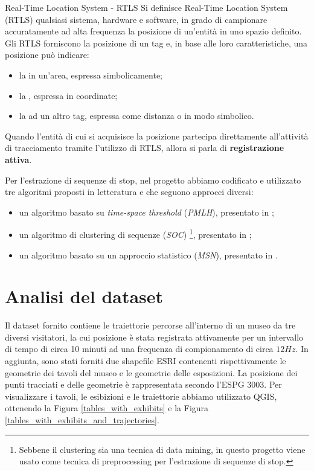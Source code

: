 \documentclass[12pt]{article}
\begin{document}
\begin{definition}{Real-Time Location System - RTLS}{}
    Si definisce Real-Time Location System (RTLS) qualsiasi sistema, hardware e software, in grado di campionare accuratamente ad alta frequenza la posizione di un'entità in uno spazio definito.\\
    Gli RTLS forniscono la posizione di un tag e, in base alle loro caratteristiche, una posizione può indicare:
    \begin{itemize}
        \item la  in un'area, espressa simbolicamente;
        \item la , espressa in coordinate;
        \item la  ad un altro tag, espressa come distanza o in modo simbolico.
    \end{itemize}
    Quando l'entità di cui si acquisisce la posizione partecipa direttamente all'attività di tracciamento tramite l'utilizzo di RTLS, allora si parla di \textbf{registrazione attiva}.
\end{definition}
Per l'estrazione di sequenze di stop, nel progetto abbiamo codificato e utilizzato tre algoritmi proposti in letteratura e che seguono approcci diversi:
\begin{itemize}
    \item un algoritmo basato su \emph{time-space threshold} (\emph{PMLH}), presentato in \cite{SpaceTimeTreshold};
    \item un algoritmo di clustering di sequenze (\emph{SOC}) \footnote{Sebbene il clustering sia una tecnica di data mining, in questo progetto viene usato come tecnica di preprocessing per l'estrazione di sequenze di stop.}, presentato in \cite{SequenceClustering};
    \item un algoritmo basato su un approccio statistico (\emph{MSN}), presentato in \cite{Statistical}.
\end{itemize}

\section{Analisi del dataset}
Il dataset fornito contiene le traiettorie percorse all'interno di un museo da tre diversi visitatori, la cui posizione è stata registrata attivamente per un intervallo di tempo di circa 10 minuti ad una frequenza di compionamento di circa $12Hz$.
In aggiunta, sono stati forniti due shapefile ESRI contenenti rispettivamente le geometrie dei tavoli del museo e le geometrie delle esposizioni.
La posizione dei punti tracciati e delle geometrie è rappresentata secondo l'ESPG 3003.
Per visualizzare i tavoli, le esibizioni e le traiettorie abbiamo utilizzato QGIS, ottenendo la Figura \ref{tables_with_exhibits} e la Figura \ref{tables_with_exhibits_and_trajectories}.
\end{document}
